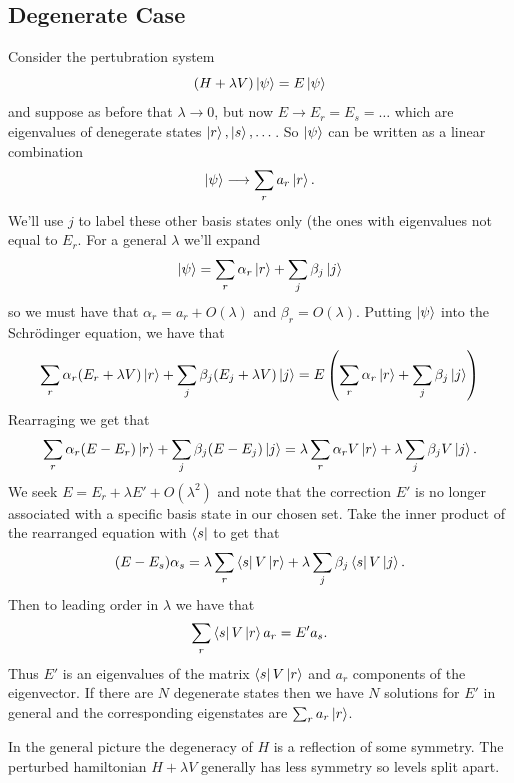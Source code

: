 \documentclass{article}
\begin{document}
\subsection{Degenerate Case}
Consider the pertubration system
\[
	(H+ \lambda V)\ket \psi = E\ket\psi
\]
and suppose as before that $ \lambda \to 0 $, but now $ E \to E_r = E_s = \dots $ which are eigenvalues of denegerate states $ \ket r, \ket s, \dots $. So $\ket \psi $ can be written as a linear combination
\[
  \ket \psi \longrightarrow \sum_r a_r \ket r.
\]
We'll use $ j $ to label these other basis states only (the ones with eigenvalues not equal to $ E_r $. For a general $ \lambda $ we'll expand
\[
  \ket\psi = \sum_r \alpha_r \ket r + \sum_j \beta_j \ket j
\]
so we must have that $ \alpha_r = a_r + O(\lambda) $ and $ \beta_r = O(\lambda) $. Putting $ \ket\psi $ into the Schr\"odinger equation, we have that
\begin{align*}
  \sum_r \alpha_r(E_r + \lambda V)\ket r + \sum_j \beta_j (E_j +\lambda V) \ket j = E\left(\sum_r \alpha_r \ket r + \sum_j \beta_j \ket j\right)
\end{align*}
Rearraging we get that
\[
\sum_r \alpha_r(E-E_r) \ket r + \sum_j\beta_j (E-E_j)\ket j = \lambda \sum_r \alpha_r V \ket r + \lambda \sum_j \beta_j V \ket j.
\]
We seek $ E = E_r +\lambda E' + O(\lambda^2) $ and note that the correction $ E' $ is no longer associated with a specific basis state in our chosen set. Take the inner product of the rearranged equation with $ \bra s $ to get that
\[
	(E-E_s)\alpha_s = \lambda \sum_r\bra s V \ket r + \lambda \sum_j \beta_j \bra s V \ket j.
\]
Then to leading order in $ \lambda $ we have that
\[
  \sum_r \bra s V \ket r a_r = E'a_s.
\]
Thus $ E' $ is an eigenvalues of the matrix $ \bra s V \ket r $ and $ a_r $ components of the eigenvector. If there are $ N $ degenerate states then we have $ N $ solutions for $ E' $ in general and the corresponding eigenstates are $ \sum_r a_r \ket r $.\par
In the general picture the degeneracy of $ H $ is a reflection of some symmetry. The perturbed hamiltonian $ H+\lambda V $ generally has less symmetry so levels split apart.
\end{document}
